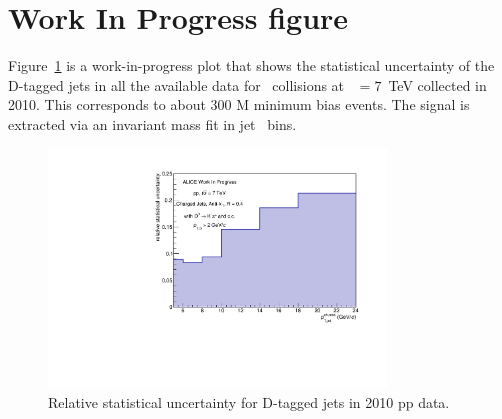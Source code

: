 \section{Work In Progress figure}
Figure~\ref{fig:HQ16_WorkInProgress_StatisticalUncertainty} is a work-in-progress plot that shows the statistical uncertainty of the D-tagged jets in all the available data for \pp\ collisions at \s~$=7$~TeV collected in 2010.
This corresponds to about 300 M minimum bias events. The signal is extracted via an invariant mass fit in jet \pt\ bins.
\begin{figure}[tbh]
\begin{center}
\includegraphics[width=0.8\textwidth]{img/HQ16_WorkInProgress_StatisticalUncertainty}
 \caption{Relative statistical uncertainty for D-tagged jets in 2010 pp data.} 
 \label{fig:HQ16_WorkInProgress_StatisticalUncertainty}
\end{center}
\end{figure}
